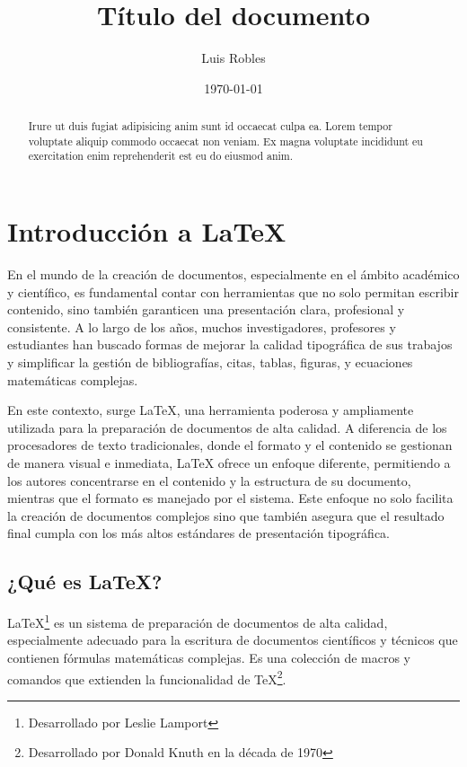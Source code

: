 \documentclass{article}
\title{Título del documento}
\author{Luis Robles}
\date{\today}
\begin{document}
\maketitle

\begin{abstract}
Irure ut duis fugiat adipisicing anim sunt id occaecat culpa ea. Lorem tempor voluptate aliquip commodo occaecat non veniam. Ex magna voluptate incididunt eu exercitation enim reprehenderit est eu do eiusmod anim.
\end{abstract}

\section{Introducción a LaTeX}
En el mundo de la creación de documentos, especialmente en el ámbito académico y científico, es fundamental contar con herramientas que no solo permitan escribir contenido, sino también garanticen una presentación clara, profesional y consistente. A lo largo de los años, muchos investigadores, profesores y estudiantes han buscado formas de mejorar la calidad tipográfica de sus trabajos y simplificar la gestión de bibliografías, citas, tablas, figuras, y ecuaciones matemáticas complejas.

En este contexto, surge \LaTeX{}, una herramienta poderosa y ampliamente utilizada para la preparación de documentos de alta calidad. A diferencia de los procesadores de texto tradicionales, donde el formato y el contenido se gestionan de manera visual e inmediata, \LaTeX{} ofrece un enfoque diferente, permitiendo a los autores concentrarse en el contenido y la estructura de su documento, mientras que el formato es manejado por el sistema. Este enfoque no solo facilita la creación de documentos complejos sino que también asegura que el resultado final cumpla con los más altos estándares de presentación tipográfica.

\subsection{¿Qué es LaTeX?}
\LaTeX{}\footnote{Desarrollado por Leslie Lamport} es un sistema de preparación de documentos de alta calidad, especialmente adecuado para la escritura de documentos científicos y técnicos que contienen fórmulas matemáticas complejas. Es una colección de macros y comandos que extienden la funcionalidad de \TeX\footnote{Desarrollado por Donald Knuth en la década de 1970}.
\end{document}
